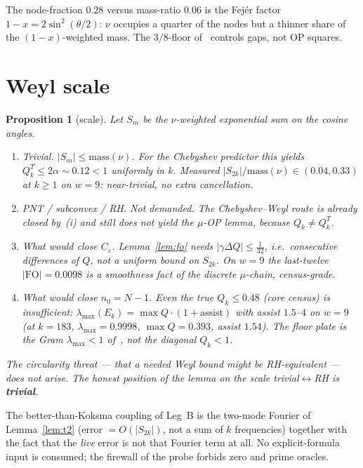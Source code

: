 \documentclass[11pt]{article}
\newtheorem{prop}{Proposition}
\theoremstyle{remark}
\begin{document}
The node-fraction $0.28$ versus mass-ratio $0.06$ is the Fej\'er
factor $1-x=2\sin^2(\theta/2)$: $\nu$ occupies a quarter of the
nodes but a thinner share of the $(1-x)$-weighted mass.  The
$3/8$-floor of~\cite{r361} controls gaps, not OP squares.

\section{Weyl scale}\label{sec:weyl}

\begin{prop}[scale]\label{prop:weyl}
Let $S_m$ be the $\nu$-weighted exponential sum on the cosine
angles.
\begin{enumerate}
\item \emph{Trivial.}  $\lvert S_m\rvert\le\mathrm{mass}(\nu)$.
  For the Chebyshev predictor this yields
  $Q_k^T\le 2\alpha\sim 0.12<1$ uniformly in $k$.
  Measured $\lvert S_{2k}\rvert/\mathrm{mass}(\nu)\in(0.04,0.33)$
  at $k\ge 1$ on $w=9$: near-trivial, no extra cancellation.
\item \emph{PNT / subconvex / RH.}  Not demanded.  The
  Chebyshev--Weyl route is already closed by~(i) and still
  does not yield the $\mu$-OP lemma, because $Q_k\neq Q_k^T$.
\item \emph{What would close $C_\varepsilon$.}
  Lemma~\ref{lem:fo} needs $\lvert\gamma\Delta Q\rvert\le\tfrac1{32}$,
  i.e.\ consecutive differences of $Q$, not a uniform bound on
  $S_{2k}$.  On $w=9$ the last-twelve $\lvert\mathrm{FO}\rvert=0.0098$
  is a smoothness fact of the discrete $\mu$-chain, census-grade.
\item \emph{What would close $n_0=N-1$.}
  Even the true $Q_k\le 0.48$ (core census) is insufficient:
  $\lambda_{\max}(E_k)=\max Q\cdot(1+\mathrm{assist})$ with
  assist $1.5$--$4$ on $w=9$ (at $k=183$,
  $\lambda_{\max}=0.9998$, $\max Q=0.393$, assist $1.54$).
  The floor plate is the Gram $\lambda_{\max}<1$ of~\cite{r382},
  not the diagonal $Q_k<1$.
\end{enumerate}
The circularity threat --- that a needed Weyl bound might be
RH-equivalent --- does not arise.  The honest position of the
lemma on the scale trivial${}\leftrightarrow{}$RH is
\textbf{trivial}.
\end{prop}

The better-than-Koksma coupling of Leg~B is the two-mode
Fourier of Lemma~\ref{lem:t2} (error $=O(\lvert S_{2k}\rvert)$,
not a sum of $k$ frequencies) together with the fact that the
\emph{live} error is not that Fourier term at all.  No
explicit-formula input is consumed; the firewall of the probe
forbids zero and prime oracles.
\end{document}

